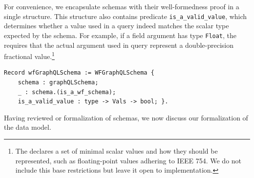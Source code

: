 For convenience, we encapsulate schemas with their well-formedness proof in a single structure. This structure also contains predicate \texttt{is_a_valid_value}, which determines whether a value used in a query indeed matches the scalar type expected by the schema. For example, if a field argument has type \texttt{Float}, the \spec requires that the actual argument used in query represent a double-precision fractional value.\footnote{The \spec declares a set of minimal scalar values and how they should be represented, such as floating-point values adhering to IEEE 754. We do not include this base restrictions but leave it open to implementation.}
%
\begin{verbatim}
Record wfGraphQLSchema := WFGraphQLSchema {
    schema : graphQLSchema;
    _ : schema.(is_a_wf_schema);
    is_a_valid_value : type -> Vals -> bool; }.
\end{verbatim}



Having reviewed or formalization of schemas, we now discuss our formalization of the data model. 

